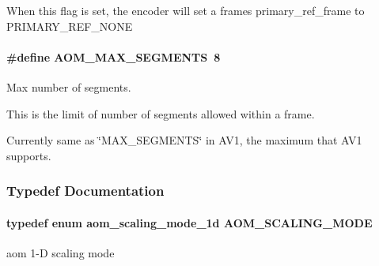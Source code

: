When this flag is set, the encoder will set a frame\textquotesingle{}s primary\+\_\+ref\+\_\+frame to P\+R\+I\+M\+A\+R\+Y\+\_\+\+R\+E\+F\+\_\+\+N\+O\+NE 
\paragraph[{\texorpdfstring{A\+O\+M\+\_\+\+M\+A\+X\+\_\+\+S\+E\+G\+M\+E\+N\+TS}{AOM_MAX_SEGMENTS}}]{\setlength{\rightskip}{0pt plus 5cm}\#define A\+O\+M\+\_\+\+M\+A\+X\+\_\+\+S\+E\+G\+M\+E\+N\+TS~8}\hypertarget{group__aom__encoder_ga58817629f5270c0db0851e354cd6e57c}{}\label{group__aom__encoder_ga58817629f5270c0db0851e354cd6e57c}


Max number of segments. 

This is the limit of number of segments allowed within a frame.

Currently same as \char`\"{}\+M\+A\+X\+\_\+\+S\+E\+G\+M\+E\+N\+T\+S\char`\"{} in A\+V1, the maximum that A\+V1 supports. 

\subsubsection{Typedef Documentation}
\paragraph[{\texorpdfstring{A\+O\+M\+\_\+\+S\+C\+A\+L\+I\+N\+G\+\_\+\+M\+O\+DE}{AOM_SCALING_MODE}}]{\setlength{\rightskip}{0pt plus 5cm}typedef enum {\bf aom\+\_\+scaling\+\_\+mode\+\_\+1d}  {\bf A\+O\+M\+\_\+\+S\+C\+A\+L\+I\+N\+G\+\_\+\+M\+O\+DE}}\hypertarget{group__aom__encoder_ga6694eedd50b128415a3434404c56d73d}{}\label{group__aom__encoder_ga6694eedd50b128415a3434404c56d73d}


aom 1-\/D scaling mode 

